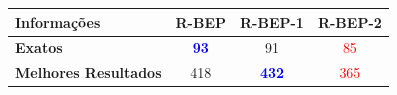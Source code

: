 
\begin{tabular}{lccc}
\hline
\rowcolor{gray!30}\textbf{Informações} &  \textbf{R-BEP} &  \textbf{R-BEP-1} &  \textbf{R-BEP-2}\\ \hline
\textbf{Exatos} & \textbf{\textcolor{blue}{93}} & 91 & \textcolor{red}{85}\\
\textbf{Melhores Resultados} & 418 & \textbf{\textcolor{blue}{432}} & \textcolor{red}{365}\\
\hline
\end{tabular}